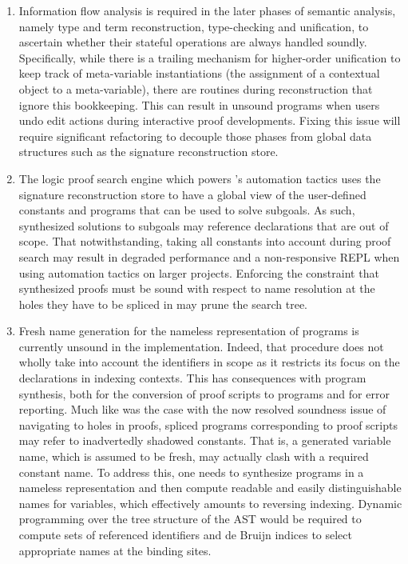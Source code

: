 \begin{enumerate}
\item
Information flow analysis is required in the later phases of semantic analysis, namely type and term reconstruction, type-checking and unification, to ascertain whether their stateful operations are always handled soundly.
Specifically, while there is a trailing mechanism for higher-order unification to keep track of meta-variable instantiations (the assignment of a contextual object to a meta-variable), there are routines during \LF reconstruction that ignore this bookkeeping.
This can result in unsound programs when users undo edit actions during interactive proof developments.
Fixing this issue will require significant refactoring to decouple those phases from global data structures such as the signature reconstruction store.
\item
The logic proof search engine which powers \Harpoon's automation tactics uses the signature reconstruction store to have a global view of the user-defined constants and programs that can be used to solve subgoals.
As such, synthesized solutions to subgoals may reference declarations that are out of scope.
That notwithstanding, taking all constants into account during proof search may result in degraded performance and a non-responsive \ac{REPL} when using automation tactics on larger projects.
Enforcing the constraint that synthesized proofs must be sound with respect to name resolution at the holes they have to be spliced in may prune the search tree.
\item
Fresh name generation for the nameless representation of \Beluga programs is currently unsound in the implementation.
Indeed, that procedure does not wholly take into account the identifiers in scope as it restricts its focus on the declarations in indexing contexts.
This has consequences with program synthesis, both for the conversion of \Harpoon proof scripts to \Beluga programs and for error reporting.
Much like was the case with the now resolved soundness issue of navigating to holes in \Harpoon proofs, spliced \Beluga programs corresponding to \Harpoon proof scripts may refer to inadvertedly shadowed constants.
That is, a generated variable name, which is assumed to be fresh, may actually clash with a required constant name.
To address this, one needs to synthesize programs in a nameless representation and then compute readable and easily distinguishable names for variables, which effectively amounts to reversing indexing.
Dynamic programming over the tree structure of the \ac{AST} would be required to compute sets of referenced identifiers and de Bruijn indices to select appropriate names at the binding sites.
\end{enumerate}

